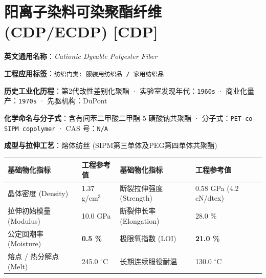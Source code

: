 \documentclass[11pt,openright,twoside,UTF8]{ctexbook}
\begin{document}
\section{阳离子染料可染聚酯纤维 (CDP/ECDP) [CDP]}
\label{sec:cdp}

\noindent\textbf{英文通用名称}：\textit{Cationic Dyeable Polyester Fiber}\par
\noindent\textbf{工程应用标签}：\texttt{纺织门类: 服装用纺织品 / 家用纺织品}\par
\noindent\textbf{历史工业化历程}：第2代改性差别化聚酯 · 实验室发现年代：\texttt{1960s} · 商业化量产：\texttt{1970s} · 先驱机构：DuPont\par
\noindent\textbf{化学命名与分子式}：含有间苯二甲酸二甲酯-5-磺酸钠共聚酯 · 分子式：\texttt{PET-co-SIPM copolymer} · CAS 号：\texttt{N/A}\par
\noindent\textbf{成型与拉伸工艺}：熔体纺丝 (SIPM第三单体及PEG第四单体共聚酯)\par

\vspace{0.15cm}
\begin{center}
\small
\begin{tabularx}{\textwidth}{p{3.8cm}Xp{3.8cm}X}
\toprule
\textbf{基础物化指标} & \textbf{工程参考值} & \textbf{基础物化指标} & \textbf{工程参考值} \\
\midrule
晶体密度 (Density) & 1.37 g/cm$^3$ & 断裂拉伸强度 (Strength) & 0.58 GPa (4.2 cN/dtex) \\
拉伸初始模量 (Modulus) & 10.0 GPa & 断裂伸长率 (Elongation) & 28.0 \% \\
公定回潮率 (Moisture) & \textbf{0.5 \%} & 极限氧指数 (LOI) & \textbf{21.0 \%} \\
熔点 / 热分解点 (Melt) & 245.0 $^\circ\mathrm{C}$ & 长期连续服役耐温 & 130.0 $^\circ\mathrm{C}$ \\
\bottomrule
\end{tabularx}
\end{center}
\vspace{0.15cm}
\end{document}
